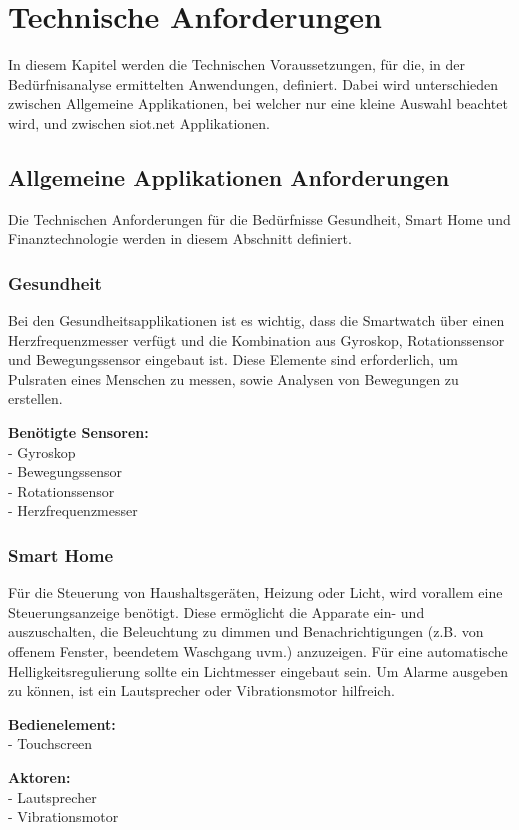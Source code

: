 \chapter{Technische Anforderungen}
In diesem Kapitel werden die Technischen Voraussetzungen, für die, in der Bedürfnisanalyse ermittelten Anwendungen, definiert. Dabei wird unterschieden zwischen Allgemeine Applikationen, bei welcher nur eine kleine Auswahl beachtet wird, und zwischen siot.net Applikationen.

\section{Allgemeine Applikationen Anforderungen}
Die Technischen Anforderungen für die Bedürfnisse Gesundheit, Smart Home und Finanztechnologie werden in diesem Abschnitt definiert.

\subsection{Gesundheit}
Bei den Gesundheitsapplikationen ist es wichtig, dass die Smartwatch über einen Herzfrequenzmesser verfügt und die Kombination aus Gyroskop, Rotationssensor und Bewegungssensor eingebaut ist.
Diese Elemente sind erforderlich, um Pulsraten eines Menschen zu messen, sowie Analysen von Bewegungen zu erstellen.

\textbf{Benötigte Sensoren:}\\
- Gyroskop\\
- Bewegungssensor\\
- Rotationssensor\\
- Herzfrequenzmesser

\subsection{Smart Home}
Für die Steuerung von Haushaltsgeräten, Heizung oder Licht, wird vorallem eine Steuerungsanzeige benötigt. Diese ermöglicht die Apparate ein- und auszuschalten, die Beleuchtung zu dimmen und Benachrichtigungen (z.B. von offenem Fenster, beendetem Waschgang uvm.) anzuzeigen. Für eine automatische Helligkeitsregulierung sollte ein Lichtmesser eingebaut sein. Um Alarme ausgeben zu können, ist ein Lautsprecher oder Vibrationsmotor hilfreich.

\textbf{Bedienelement:}\\
- Touchscreen

\textbf{Aktoren:}\\
- Lautsprecher\\
- Vibrationsmotor

